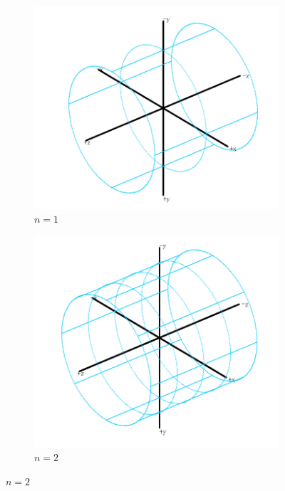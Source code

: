 \documentclass{Humantech_Paper_Awardfullpaper_hutech}
\begin{document}
\begin{figure}[h]
	\begin{center}
		\begin{subfigure}{.15\textwidth}
			\includegraphics[width=\textwidth]{subdivision1}
			\caption{$n=1$}
		\end{subfigure}
		\begin{subfigure}{.15\textwidth}
			\includegraphics[width=\textwidth]{subdivision2}
			\caption{$n=2$}
		\end{subfigure}

\end{center}
\end{figure}
\end{document}
